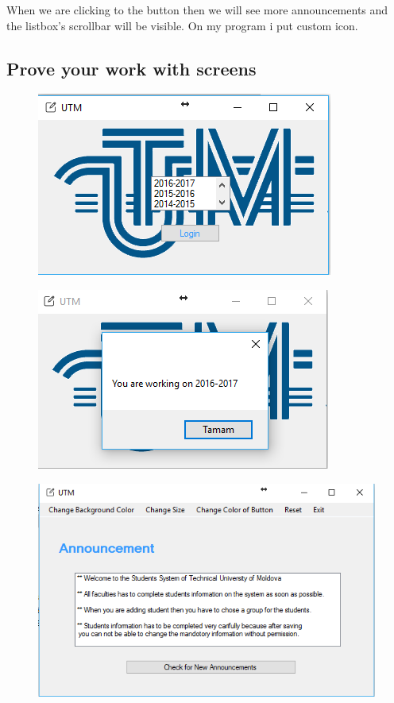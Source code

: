 When we are clicking to the button then we will see more announcements and the
listbox’s scrollbar will be visible.
On my program i put custom icon.
	



\subsection{Prove your work with screens}

\begin{figure}
	\centering
	\includegraphics[width=0.7\linewidth]{form1}
	\caption{}
	\label{fig:form1}
\end{figure}

\begin{figure}
	\centering
	\includegraphics[width=0.7\linewidth]{form1-2}
	\caption{}
	\label{fig:form1-2}
\end{figure}


\begin{figure}
	\centering
	\includegraphics[width=0.7\linewidth]{form2}
	\caption{}
	\label{fig:form2}
\end{figure}


